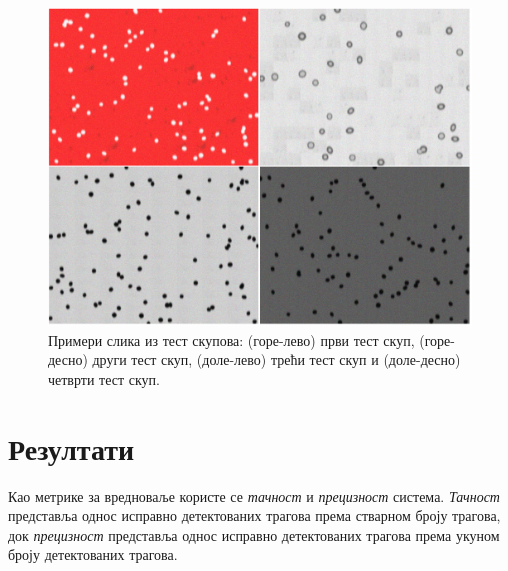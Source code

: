 \documentclass[12pt,a4paper,serbian,oneside]{book}
\begin{document}
\begin{figure}[h]
\begin{center}
\includegraphics[width=150mm]{images/test.png}
\end{center}
\caption{Примери слика из тест скупова: (горе-лево) први тест скуп, (горе-десно) други тест скуп, (доле-лево) трећи тест скуп и (доле-десно) четврти тест скуп.}
\label{fig:test}
\end{figure}

\section{Резултати}

Као метрике за вредноваље користе се \textit{тачност} и \textit{прецизност} система. \textit{Тачност} представља однос исправно детектованих трагова према стварном броју трагова, док \textit{прецизност} представља однос исправно детектованих трагова према укуном броју детектованих трагова.
\end{document}
